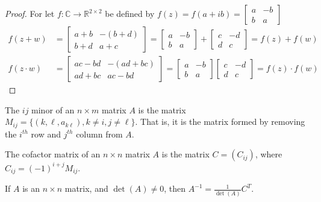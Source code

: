 \documentclass[crop=false,class=book,oneside]{standalone}
\begin{document}
\begin{proof}
For let $f:\mathbb{C}\rightarrow\mathbb{R}^{2\times 2}$ be defined by $f(z) = f(a+ib) = \begin{bmatrix}a & -b\\b & a\end{bmatrix}$
\begin{align*}
    f(z+w)&=\begin{bmatrix}a+b & -(b+d)\\b+d& a+c\end{bmatrix}=\begin{bmatrix}a&-b\\b&a\end{bmatrix}+\begin{bmatrix}c&-d\\d&c\end{bmatrix}=f(z)+f(w)\\
    f(z\cdot w)&=\begin{bmatrix}ac-bd&-(ad+bc)\\ad+bc&ac-bd\end{bmatrix}=\begin{bmatrix}a&-b\\b&a\end{bmatrix}\begin{bmatrix}c&-d\\d&c\end{bmatrix}=f(z)\cdot f(w)
\end{align*}
\end{proof}
\begin{definition}
The $ij$ minor of an $n\times m$ matrix $A$ is the matrix $M_{ij}=\{(k,\ell,a_{k\ell}),k\ne i,j\ne\ell\}$. That is, it is the matrix formed by removing the $i^{th}$ row and $j^{th}$ column from $A$.
\end{definition}
\begin{definition}
The cofactor matrix of an $n\times n$ matrix $A$ is the matrix $C=(C_{ij})$, where $C_{ij}=(-1)^{i+j}M_{ij}$.
\end{definition}
\begin{theorem}
If $A$ is an $n\times n$ matrix, and $\det(A) \ne 0$, then $A^{-1}= \frac{1}{\det(A)}C^{T}$.
\end{theorem}
\end{document}
